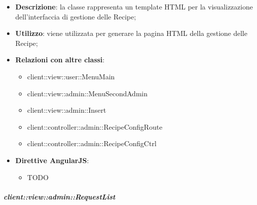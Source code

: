 			\begin{itemize}
				\item \textbf{Descrizione}: la classe rappresenta un template HTML per la visualizzazione dell'interfaccia di gestione delle Recipe;
				\item \textbf{Utilizzo}: viene utilizzata per generare la pagina HTML della gestione delle Recipe;
				\item \textbf{Relazioni con altre classi}:
					\begin{itemize}
						\item client::view::user::MenuMain
						\item client::view::admin::MenuSecondAdmin
						\item client::view::admin::Insert
						\item client::controller::admin::RecipeConfigRoute
						\item client::controller::admin::RecipeConfigCtrl
					\end{itemize}
				\item \textbf{Direttive AngularJS}:
					\begin{itemize}
						\item TODO
					\end{itemize}
			\end{itemize}

		\subparagraph{client::view::admin::RequestList} %
		\label{subp:bdsm_app_client_view_admin_requestlist}

